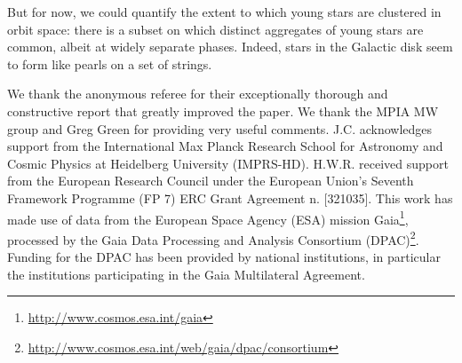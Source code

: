 \documentclass[twocolumn]{aastex631}
\begin{document}
But for now, we could quantify the extent to which young stars are clustered in orbit space: there is a subset on which distinct aggregates of young stars are common, albeit at widely separate phases. Indeed, stars in the Galactic disk seem to form like pearls on a set of strings.


\begin{acknowledgments}
We thank the anonymous referee for their exceptionally thorough and constructive report that greatly improved the paper.
We thank the MPIA MW group and Greg Green for providing very useful comments. J.C. acknowledges support from the International Max Planck Research School for Astronomy and Cosmic Physics at Heidelberg University (IMPRS-HD). H.W.R. received support from the European Research Council under the European Union's Seventh Framework Programme (FP 7) ERC Grant Agreement n. [321035].
This work has made use of data from the European Space Agency (ESA) mission Gaia\footnote{\url{http://www.cosmos.esa.int/gaia}}, processed by the Gaia Data Processing and Analysis Consortium (DPAC)\footnote{\url{http://www.cosmos.esa.int/web/gaia/dpac/consortium}}. Funding for the DPAC has been provided by national institutions, in particular the institutions participating in the Gaia Multilateral Agreement. 
\end{acknowledgments}

%


\end{document}
